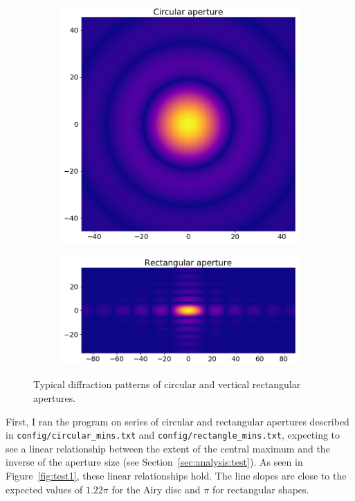 \documentclass{article}
\begin{document}
\begin{figure}
    \centering
    \begin{subfigure}{0.5\textwidth}
        \centering
        \includegraphics[width=\textwidth]{pictures/def/out0}
        \caption{}\label{fig:typ:round}
    \end{subfigure}%
    \begin{subfigure}{0.5\textwidth}
        \centering
        \includegraphics[width=\textwidth]{pictures/def/out1}
        \caption{}\label{fig:typ:rect}
    \end{subfigure}
    \caption{Typical diffraction patterns of circular and vertical rectangular apertures.}\label{fig:typ}
\end{figure}

First, I ran the program on series of circular and rectangular apertures described in \texttt{config/circular\_mins.txt} and \texttt{config/rectangle\_mins.txt}, expecting to see a linear relationship between the extent of the central maximum and the inverse of the aperture size (see Section~\ref{sec:analysis:test}). As seen in Figure~\ref{fig:test1}, these linear relationships hold. The line slopes are close to the expected values of $1.22\pi$ for the Airy disc and $\pi$ for rectangular shapes.
\end{document}

